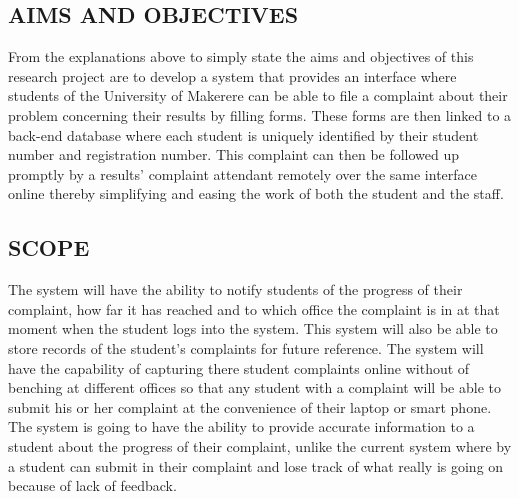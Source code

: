 \documentclass[10pt,a4paper]{report}
\begin{document}
\begin{flushleft}
\subsection*{AIMS AND OBJECTIVES}From the explanations above to simply state the aims and objectives of this research project are to develop a system that provides an interface where students of the University of Makerere can be able to file a complaint about their problem concerning their results by filling forms. These forms are then linked to a back-end database where each student is uniquely identified by their student number and registration number. This complaint can then be followed up promptly by a results' complaint attendant remotely over the same interface online thereby simplifying and easing the work of both the student and the staff.\\

\subsection*{SCOPE}The system will have the ability to notify students of the progress of their complaint, how far it has reached and to which office the complaint is in at that moment when the student logs into the system. This system will also be able to store records of the student's complaints for future reference. The system will have the capability of capturing there student complaints online without of benching at different offices so that any student with a complaint will be able to submit his or her complaint at the convenience of their laptop or smart phone. The system is going to have the ability to provide accurate information to a student about the progress of their complaint, unlike the current system where by a student can submit in their complaint and lose track of what really is going on because of lack of feedback.  


\end{flushleft}
\end{document}

